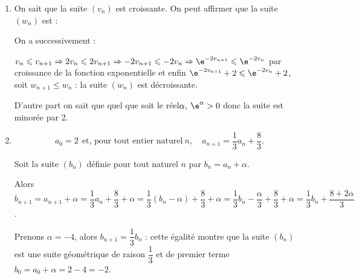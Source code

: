 \begin{enumerate}[resume]
\item On sait que la suite $\left(v_n\right)$ est croissante. On peut affirmer que la suite $\left(w_n\right)$ est :

On a successivement :

$v_n \leqslant v_{n+1} \Rightarrow 2v_n \leqslant 2v_{n+1} \Rightarrow - 2v_{n+1} \leqslant - 2v_n\Rightarrow \e^{- 2v_{n+1}} \leqslant \e^{- 2v_n}$ par croissance de la fonction exponentielle et enfin $\e^{- 2v_{n+1}} + 2 \leqslant \e^{- 2v_n} + 2$, soit $w_{n+1} \leqslant w_n$ : la suite $\left(w_n\right)$ est décroissante.

D'autre part on sait que quel que soit le réel$\alpha, \: \e^{\alpha} > 0$ donc  la suite est minorée par 2.
\item %

\[a_0 = 2 \:\:\text{et, pour tout entier naturel}\: n, \quad a_{n+1} = \dfrac13a_n + \dfrac83.\]

Soit la suite $\left(b_n\right)$ définie pour tout naturel $n$ par $b_n = a_n + \alpha$.

Alors $b_{n+1} = a_{n+1} + \alpha = \dfrac13a_n + \dfrac83 + \alpha = \dfrac13\left(b_n - \alpha \right) + \dfrac83 + \alpha = \dfrac13b_n - \dfrac{\alpha}{3} + \dfrac83 + \alpha = \dfrac13b_n + \dfrac{8 + 2\alpha}{3}$.

Prenons $\alpha = - 4$, alors $b_{n+1} = \dfrac13b_n$ : cette égalité montre que la suite $\left(b_n\right)$ est une suite géométrique de raison $\dfrac13$ et de premier terme $b_0 = a_0 + \alpha = 2 - 4 = - 2$.


\end{enumerate}
